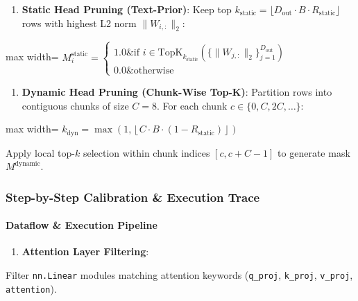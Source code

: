 \begin{enumerate}
\item \textbf{Static Head Pruning (Text-Prior)}:
Keep top $k_{\text{static}} = \lfloor D_{\text{out}} \cdot B \cdot R_{\text{static}} \rfloor$ rows with highest L2 norm $\|W_{i, :}\|_2$:
\end{enumerate}
\begin{center}
\begin{adjustbox}{max width=\columnwidth}
$\displaystyle
M_i^{\text{static}} = \begin{cases} 1.0 \& \text{if } i \in \text{TopK}_{k_{\text{static}}}\left( \{ \|W_{j, :}\|_2 \}_{j=1}^{D_{\text{out}}} \right) \\ 0.0 \& \text{otherwise} \end{cases}
$
\end{adjustbox}
\end{center}

\begin{enumerate}
\item \textbf{Dynamic Head Pruning (Chunk-Wise Top-K)}:
Partition rows into contiguous chunks of size $C = 8$. For each chunk $c \in \{0, C, 2C, \dots\}$:
\end{enumerate}
\begin{center}
\begin{adjustbox}{max width=\columnwidth}
$\displaystyle
k_{\text{dyn}} = \max\left(1, \left\lfloor C \cdot B \cdot (1 - R_{\text{static}}) \right\rfloor\right)
$
\end{adjustbox}
\end{center}
Apply local top-$k$ selection within chunk indices $[c, c+C-1]$ to generate mask $M^{\text{dynamic}}$.


\subsubsection*{Step-by-Step Calibration \& Execution Trace}

\paragraph{Dataflow \& Execution Pipeline}

\begin{enumerate}
\item \textbf{Attention Layer Filtering}:
\end{enumerate}
Filter \texttt{nn.Linear} modules matching attention keywords (\texttt{q\_proj}, \texttt{k\_proj}, \texttt{v\_proj}, \texttt{attention}).

